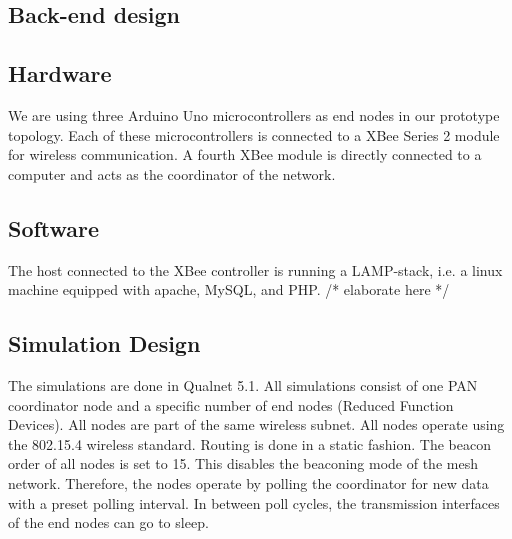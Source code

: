 
\subsection{Back-end design}

\subsection{Hardware}
We are using three Arduino Uno microcontrollers as end nodes in our prototype topology. Each of these microcontrollers is connected to a XBee Series 2 module for wireless communication. A fourth XBee module is directly connected to a computer and acts as the coordinator of the network.

\subsection{Software}
The host connected to the XBee controller is running a LAMP-stack, i.e. a linux machine equipped with apache, MySQL, and PHP.
/* elaborate here */

\subsection{Simulation Design}

The simulations are done in Qualnet 5.1. All simulations consist of one PAN coordinator node and a specific number of end nodes (Reduced Function Devices). All nodes are part of the same wireless subnet. All nodes operate using the 802.15.4 wireless standard. Routing is done in a static fashion. The beacon order of all nodes is set to 15. This disables the beaconing mode of the mesh network. Therefore, the nodes operate by polling the coordinator for new data with a preset polling interval. In between poll cycles, the transmission interfaces of the end nodes can go to sleep.

